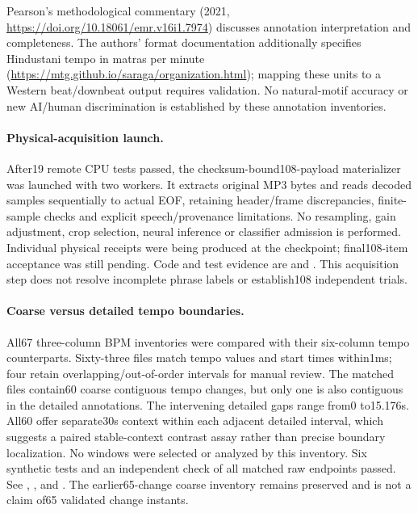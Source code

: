 Pearson's methodological commentary (2021,
\url{https://doi.org/10.18061/emr.v16i1.7974}) discusses annotation interpretation
and completeness. The authors' format documentation additionally specifies
Hindustani tempo in matras per minute
(\url{https://mtg.github.io/saraga/organization.html}); mapping these units to a
Western beat/downbeat output requires validation. No natural-motif accuracy or
new AI/human discrimination is established by these annotation inventories.

\paragraph{Physical-acquisition launch.}
After19 remote CPU tests passed, the checksum-bound108-payload materializer
was launched with two workers. It extracts original MP3 bytes and reads decoded
samples sequentially to actual EOF, retaining header/frame discrepancies,
finite-sample checks and explicit speech/provenance limitations. No resampling,
gain adjustment, crop selection, neural inference or classifier admission is
performed. Individual physical receipts were being produced at the checkpoint;
final108-item acceptance was still pending. Code and test evidence are
 and
. This acquisition step
does not resolve incomplete phrase labels or establish108 independent trials.

\paragraph{Coarse versus detailed tempo boundaries.}
All67 three-column BPM inventories were compared with their six-column tempo
counterparts. Sixty-three files match tempo values and start times within1ms;
four retain overlapping/out-of-order intervals for manual review. The matched
files contain60 coarse contiguous tempo changes, but only one is also contiguous
in the detailed annotations. The intervening detailed gaps range from0 to15.176s.
All60 offer separate30s context within each adjacent detailed interval, which
suggests a paired stable-context contrast assay rather than precise boundary
localization. No windows were selected or analyzed by this inventory. Six
synthetic tests and an independent check of all matched raw endpoints passed.
See ,
, and
. The earlier65-change coarse
inventory remains preserved and is not a claim of65 validated change instants.

